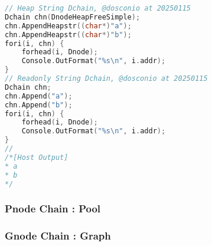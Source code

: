 \lstset{style=GlobalCxx}
\begin{lstlisting}[language=C++]
// Heap String Dchain, @dosconio at 20250115
Dchain chn(DnodeHeapFreeSimple);
chn.AppendHeapstr((char*)"a");
chn.AppendHeapstr((char*)"b");
fori(i, chn) {
	forhead(i, Dnode);
	Console.OutFormat("%s\n", i.addr);
}
// Readonly String Dchain, @dosconio at 20250115
Dchain chn;
chn.Append("a");
chn.Append("b");
fori(i, chn) {
	forhead(i, Dnode);
	Console.OutFormat("%s\n", i.addr);
}
//
/*[Host Output]
* a
* b
*/
\end{lstlisting}

\subsubsection{Pnode Chain : Pool}

\subsubsection{Gnode Chain : Graph}



